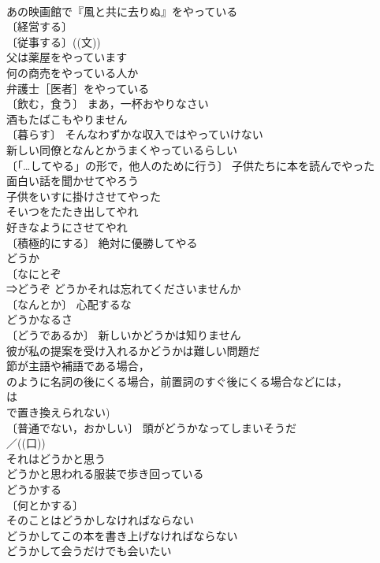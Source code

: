 \documentclass[8pt]{extreport}
\begin{document}
\begin{CJK}{UTF8}{min}
\\	あの映画館で『風と共に去りぬ』をやっている 
\\	〔経営する〕
\\	〔従事する〕((文)) 
\\	父は薬屋をやっています 
\\	何の商売をやっている人か 
\\	弁護士［医者］をやっている 
\\	〔飲む，食う〕 まあ，一杯おやりなさい 
\\	酒もたばこもやりません 
\\	〔暮らす〕 そんなわずかな収入ではやっていけない 
\\	新しい同僚となんとかうまくやっているらしい 
\\	〔「…してやる」の形で，他人のために行う〕 子供たちに本を読んでやった 
\\	面白い話を聞かせてやろう 
\\	子供をいすに掛けさせてやった 
\\	そいつをたたき出してやれ 
\\	好きなようにさせてやれ 
\\	〔積極的にする〕 絶対に優勝してやる 
\\	どうか	
\\	〔なにとぞ　
\\	⇒どうぞ どうかそれは忘れてくださいませんか 
\\	〔なんとか〕 心配するな
\\	どうかなるさ 
\\	〔どうであるか〕 新しいかどうかは知りません 
\\	彼が私の提案を受け入れるかどうかは難しい問題だ 
\\	節が主語や補語である場合，
\\	のように名詞の後にくる場合，前置詞のすぐ後にくる場合などには，
\\	は
\\	で置き換えられない) 
\\	〔普通でない，おかしい〕 頭がどうかなってしまいそうだ 
\\	／((口)) 
\\	それはどうかと思う 
\\	どうかと思われる服装で歩き回っている 
\\	どうかする 
\\	〔何とかする〕 
\\	そのことはどうかしなければならない 
\\	どうかしてこの本を書き上げなければならない 
\\	どうかして会うだけでも会いたい 

\end{CJK}
\end{document}
